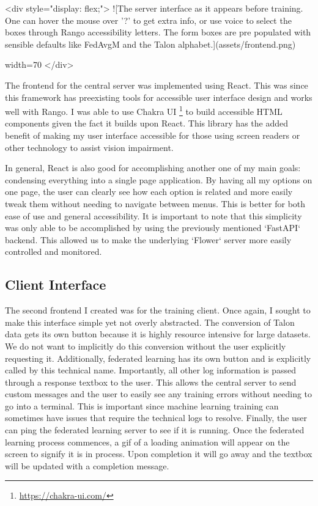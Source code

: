 \documentclass[manuscript,screen,review]{acmart}
\begin{document}
<div style="display: flex;">
![The server interface as it appears before training. One can hover the mouse over '?' to get extra info, or use voice to select the boxes through Rango accessibility letters.  The form boxes are pre populated with sensible defaults like FedAvgM and the Talon alphabet.](assets/frontend.png){width=70%
</div>

The frontend for the central server was implemented using React. This was since this framework has preexisting tools for accessible user interface design and works well with Rango. I was able to use Chakra UI \footnote{\url{https://chakra-ui.com/}} to build accessible HTML components given the fact it builds upon React. This library has the added benefit of making my user interface accessible for those using screen readers or other technology to assist vision impairment.

In general, React is also good for accomplishing another one of my main goals: condensing everything into a single page application. By having all my options on one page, the user can clearly see how each option is related and more easily tweak them without needing to navigate between menus. This is better for both ease of use and general accessibility. It is important to note that this simplicity was only able to be accomplished by using the previously mentioned `FastAPI` backend. This allowed us to make the underlying `Flower` server more easily controlled and monitored.

\subsection{ Client Interface}

The second frontend I created was for the training client. Once again, I sought to make this interface simple yet not overly abstracted. The conversion of Talon data gets its own button because it is highly resource intensive for large datasets. We do not want to implicitly do this conversion without the user explicitly requesting it. Additionally, federated learning has its own button and is explicitly called by this technical name. Importantly, all other log information is passed through a response textbox to the user. This allows the central server to send custom messages and the user to easily see any training errors without needing to go into a terminal. This is important since machine learning training can sometimes have issues that require the technical logs to resolve. Finally, the user can ping the federated learning server to see if it is running. Once the federated learning process commences, a gif of a loading animation will appear on the screen to signify it is in process. Upon completion it will go away and the textbox will be updated with a completion message.

}
\end{document}
